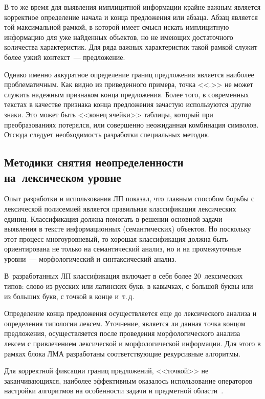 \begin{multicols}{2}
     В то же время для выявления имплицитной информации крайне важным 
является корректное определение начала и конца предложения или абзаца. 
Абзац является той максимальной рамкой, в которой имеет смысл искать 
имплицитную информацию для уже найденных объектов, но не име\-ющих 
достаточного количества характеристик. Для ряда важных характеристик такой 
рамкой служит более узкий контекст~--- предложение. 
     
     Однако именно аккуратное определение границ предложения является 
наиболее проблематичным. Как видно из приведенного примера, точка <<.>> 
не может служить надежным признаком конца предложения. Более того, в 
современных текстах в качестве признака конца предложения зачастую 
используются другие знаки. Это может быть <<конец ячейки>> таблицы, 
который при преобразованиях потерялся, или совершенно неожиданная 
комбинация символов. Отсюда следует необходимость разработки специальных 
методик.

\subsection{Методики снятия неопределенности на~лексическом уровне}

     Опыт разработки и использования ЛП показал, что главным способом 
борьбы с лексической полисемией является правильная классификация 
лексических единиц. Классификация должна помогать в решении основной 
задачи~--- выявления в тексте информационных (семантических) объектов. Но 
поскольку этот процесс многоуровневый, то хорошая классификация должна 
быть ориентирована не только на семантический анализ, но и на 
промежуточные уровни~--- морфологический и синтаксический анализ. 

В~разработанных ЛП классификация включает в себя более 20~лексических 
типов: слово из русских или латинских букв, в кавычках, с большой буквы или 
из больших букв, с точкой в конце и~т.\,д. 
     
     Определение конца предложения осуществляется еще до лексического 
анализа и определения типологии лексем. Уточнение, является ли данная точка 
концом предложения, осуществляется после проведения 
морфологического анализа лексем с привлечением лексической и 
морфологической информации. Для этого в рамках блока ЛМА разработаны 
соответствующие рекурсивные алго\-ритмы. 
{

}
     
     Для корректной фиксации границ предложений, <<точкой>> не 
заканчивающихся, наиболее эффективным оказалось использование операторов 
настройки алгоритмов на особенности задачи и предметной области~\cite{13kuz, 15kuz, 14kuz}. 


\end{multicols}
